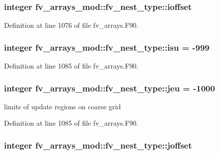 \subsubsection[{ioffset}]{\setlength{\rightskip}{0pt plus 5cm}integer fv\-\_\-arrays\-\_\-mod\-::fv\-\_\-nest\-\_\-type\-::ioffset}\label{structfv__arrays__mod_1_1fv__nest__type_a8de72175222aeea5f0b915b2ca1c0083}


Definition at line 1076 of file fv\-\_\-arrays.\-F90.

\subsubsection[{isu}]{\setlength{\rightskip}{0pt plus 5cm}integer fv\-\_\-arrays\-\_\-mod\-::fv\-\_\-nest\-\_\-type\-::isu = -\/999}\label{structfv__arrays__mod_1_1fv__nest__type_a00e4c8056d2cdb4d365658f28b224db0}


Definition at line 1085 of file fv\-\_\-arrays.\-F90.

\subsubsection[{jeu}]{\setlength{\rightskip}{0pt plus 5cm}integer fv\-\_\-arrays\-\_\-mod\-::fv\-\_\-nest\-\_\-type\-::jeu = -\/1000}\label{structfv__arrays__mod_1_1fv__nest__type_acd802c1e3bcabb89e088cf208df03909}


limits of update regions on coarse grid 



Definition at line 1085 of file fv\-\_\-arrays.\-F90.

\subsubsection[{joffset}]{\setlength{\rightskip}{0pt plus 5cm}integer fv\-\_\-arrays\-\_\-mod\-::fv\-\_\-nest\-\_\-type\-::joffset}\label{structfv__arrays__mod_1_1fv__nest__type_a0947c02b782d243a3ba7c1ba990d2995}


